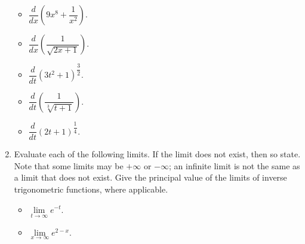 \documentclass[fleqn]{article}
\begin{document}
\begin{enumerate}
\begin{itemize}

      \item $\dfrac{d}{dx} \left(9x^8+\dfrac{1}{x^2}\right)$.



      \item $\dfrac{d}{dx} \left(\dfrac{1}{\sqrt{2x+1}}\right)$.



      \item $\dfrac{d}{dt} \left(3t^2+1\right)^{\dfrac{3}{2}}$.



      \item $\dfrac{d}{dt} \left(\dfrac{1}{\sqrt[3]{t+1}}\right)$.



      \item $\dfrac{d}{dt} \left(2t+1\right)^{\dfrac{1}{4}}$.



    \end{itemize}

    \item Evaluate each of the following limits. If the limit does not exist, then so
    state. Note that some limits may be $+\infty$ or $-\infty$; an infinite limit is not the
    same as a limit that does not exist. Give the principal value of the limits of
    inverse trigonometric functions, where applicable.
    \begin{itemize}
      \item $\lim\limits_{t \to \infty} e^{-t}$.
      
      \item $\lim\limits_{x \to \infty} e^{2-x}$. 


\end{itemize}
\end{enumerate}
\end{document}
